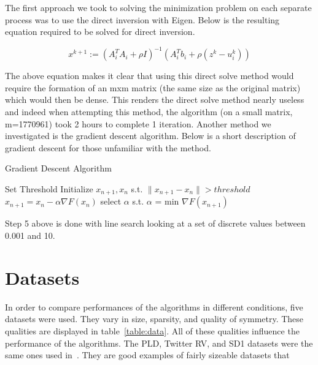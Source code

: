 \documentclass[letterpaper,11pt,onecolumn]{article}
\begin{document}
The first approach we took to solving the minimization problem on each separate process was to use the direct inversion with Eigen. Below is the resulting equation required to be solved for direct inversion.
\begin{center}
  \begin{equation}
	x^{k+1} := (A_{i}^{T}A_{i} + \rho I)^{-1}(A_{i}^{T}b_{i} + \rho(z^{k} - u_{i}^{k}))
	\label{}
  \end{equation}
\end{center}
The above equation makes it clear that using this direct solve method would require the formation of an mxm matrix (the same size as the original matrix) which would then be dense. This renders the direct solve method nearly useless and indeed when attempting this method, the algorithm (on a small matrix, m=1770961) took 2 hours to complete 1 iteration.
\newline
\linebreak
Another method we investigated is the gradient descent algorithm. Below is a short description of gradient descent for those unfamiliar with the method.

\begin{center}
  \begin{algorithm}
	\caption{Gradient Descent Algorithm}
	\begin{algorithmic}[1]
	  \STATE Set Threshold
	  \STATE Initialize $x_{n+1}, x_{n}$ s.t. $\|x_{n+1} - x_{n}\| > threshold$
	  \STATE $x_{n+1} = x_{n} - \alpha \nabla F(x_{n})$
	  \STATE select $\alpha$  s.t. $\alpha$ = min $\nabla F(x_{n+1})$
	  \ENDWHILE
	\end{algorithmic}
  \end{algorithm}
\end{center}
Step 5 above is done with line search looking at a set of discrete values between 0.001 and 10.


\section{Datasets}
In order to compare performances of the algorithms in different conditions, five datasets were used. They vary in size, sparsity, and quality of symmetry. These qualities are displayed in table~\ref{table:data}. All of these qualities influence the performance of the algorithms. The PLD, Twitter RV, and SD1 datasets were the same ones used in~\cite{Joyce}. They are good examples of fairly sizeable datasets that 
\end{document}
